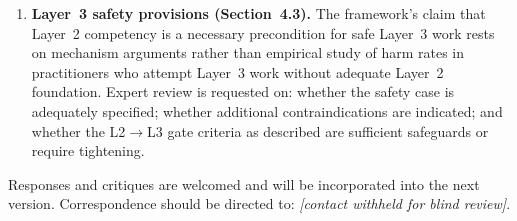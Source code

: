 \documentclass[12pt, a4paper]{article}
\begin{document}
\begin{enumerate}[leftmargin=2em]
\item \textbf{Layer~3 safety provisions (Section~4.3).}
The framework's claim that Layer~2 competency is a necessary precondition for safe
Layer~3 work rests on mechanism arguments rather than empirical study of harm rates
in practitioners who attempt Layer~3 work without adequate Layer~2 foundation.
Expert review is requested on: whether the safety case is adequately specified;
whether additional contraindications are indicated; and whether the L2$\to$L3 gate
criteria as described are sufficient safeguards or require tightening.

\end{enumerate}

\noindent Responses and critiques are welcomed and will be incorporated into the next
version. Correspondence should be directed to: \textit{[contact withheld for
blind review]}.

\newpage


\end{document}
